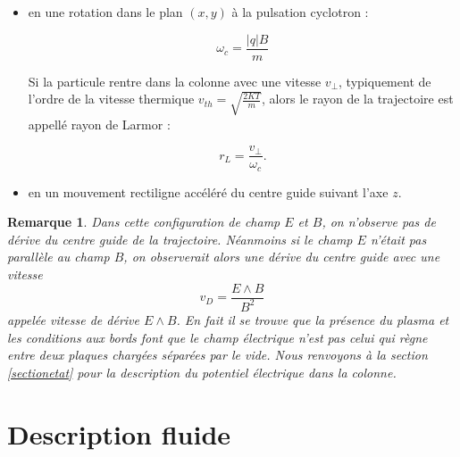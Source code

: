 \documentclass{book}
\newtheorem{rem}{Remarque}[chapter]
\begin{document}
\begin{itemize}
\item en une rotation
dans le plan $(x,y)$ \`a la pulsation cyclotron :

\begin{equation}
\omega_c=\frac{|q|B}{m}
\end{equation}

Si la particule rentre dans la colonne avec une vitesse
$v_{\perp}$, typiquement de l'ordre de la vitesse thermique
$v_{th}=\sqrt{\frac{2KT}{m}}$, alors le rayon de la trajectoire
est appell\'e rayon de Larmor :

\begin{equation}
r_L=\frac{v_{\perp}}{\omega_c}.
\end{equation}

\item en un mouvement rectiligne acc\'el\'er\'e du centre
guide
suivant l'axe $z$.
\end{itemize}

\begin{rem}
Dans cette configuration de champ $E$ et $B$, on n'observe pas 
de d\'erive du centre guide de la trajectoire. N\'eanmoins si le champ
$E$ n'\'etait pas parall\`ele au champ $B$, on observerait alors
une d\'erive du centre guide avec  une vitesse 
\begin{equation}
v_D=\frac{E\wedge B}{B^2}
\end{equation}
appel\'ee vitesse de d\'erive $E\wedge B$.
En fait il se trouve que la pr\'esence du plasma et les conditions aux
bords font que le champ \'electrique n'est pas celui qui r\`egne entre
deux plaques charg\'ees s\'epar\'ees par le vide. Nous renvoyons \`a
la section \ref{sectionetat} pour la description du potentiel
\'electrique dans la colonne.
\end{rem}


\section{Description fluide}
\end{document}
